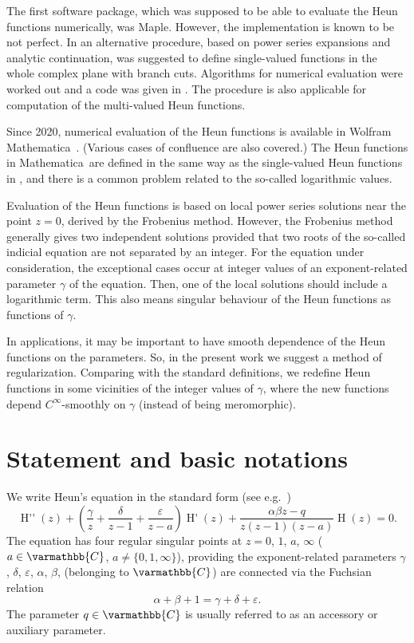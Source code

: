 \documentclass[11pt]{article}
\newcommand{\MF}[1]{\mathop{\mbox{$#1$}}\nolimits}
\newcommand{\Cb}{\varmathbb{C}}%
\def\Heun{H}%
\begin{document}
The first software package, which was supposed to be able to evaluate the Heun functions
numerically, was Maple\texttrademark. However, the implementation is known to be not perfect.
In \cite{Mot15} an alternative procedure, based on power series expansions and analytic continuation, was suggested to define single-valued functions in the whole complex plane with branch cuts. Algorithms for numerical evaluation were worked out and a code was given in \cite{mycode}. The procedure is also applicable for computation of the multi-valued Heun functions.

Since 2020, numerical evaluation of the Heun functions is available in Wolfram Mathematica\texttrademark\ \cite{MathRelease2020}. (Various cases of confluence are also covered.) The Heun functions in Mathematica\texttrademark\ are defined in the same way as the single-valued Heun functions in \cite{Mot15}, and there is a common problem related to the so-called logarithmic values.

Evaluation of the Heun functions is based on local power series solutions near the point ${z = 0}$, derived by the Frobenius method. However, the Frobenius method generally gives two independent solutions provided that two roots of the so-called indicial equation are not separated by an integer. For the equation under consideration, the exceptional cases occur at integer values of an exponent-related parameter $\gamma$ of the equation. Then, one of the local solutions should include a logarithmic term. This also means singular behaviour of the Heun functions as functions of $\gamma$. 

In applications, it may be important to have smooth dependence of the Heun functions on the parameters.
So, in the present work we suggest a method of regularization. Comparing with the standard definitions, we redefine Heun functions in some vicinities of the integer values of $\gamma$, where the new functions depend $C^\infty$-smoothly on $\gamma$ (instead of being meromorphic).


\section{Statement and basic notations} 
\label{sect:statement}

We write Heun's equation in the standard form (see e.g.\ \cite{Erdelyi1955})
\begin{equation}
  \MF{\Heun''}(z)+\left(\frac{\gamma}{z}+\frac{\delta}{z-1}+
  \frac{\varepsilon}{z-a}\right)\MF{\Heun'}(z)+
  \frac{\alpha\beta z-q}{z(z-1)(z-a)}\MF{\Heun}(z)=0.
\label{eq:Heun}
\end{equation}
The equation has four regular singular points at $z=0$, $1$, $a$,
$\infty$ ($a \in\Cb$, $a\neq\{0,1,\infty\}$), providing the exponent-related parameters $\gamma$, $\delta$, $\varepsilon$, $\alpha$, $\beta$,  (belonging to $\Cb$) are  connected via the Fuchsian
relation
\begin{equation*}
\alpha+\beta+1=\gamma+\delta+\varepsilon.
\end{equation*}
The parameter $q\in\Cb$ is usually referred to as an accessory or auxiliary
parameter.
\end{document}
